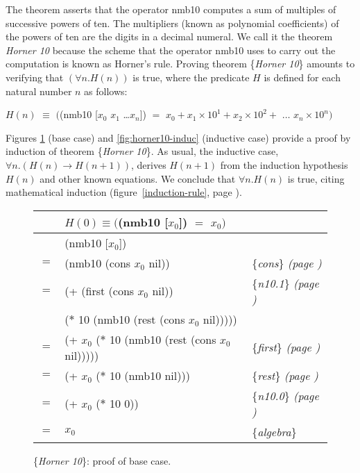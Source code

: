 The theorem asserts that the operator \textsf{nmb10}
computes a sum of multiples of successive powers of ten.
The multipliers
(known as polynomial coefficients)
of the powers of ten are the digits in a decimal numeral.
We call it the theorem \emph{Horner 10} because
the scheme that the operator \textsf{nmb10} uses to carry out the computation is
known as Horner's rule.
Proving theorem \{\emph{Horner 10}\} amounts to
verifying that $(\forall n.H(n))$ is true,
where the predicate $H$ is defined for each natural number $n$
as follows:
\begin{center}
$H(n)$ $\equiv$ $($\textsf{(nmb10 [$x_0$ $x_1$ \dots $x_{n}$])} $=$
$x_0 + x_1 \times 10^1 + x_2 \times 10^2 +$ $\dots$ $x_{n} \times 10^{n})$
\end{center}

Figures \ref{fig:horner10-base} (base case) and \ref{fig:horner10-induc}
(inductive case) provide a proof by induction of theorem \{\emph{Horner 10}\}.
As usual, the inductive case, $\forall n. (H(n) \rightarrow H(n+1))$,
derives $H(n+1)$ from the induction hypothesis $H(n)$ and other known
equations.
We conclude that $\forall n.H(n)$ is true,
citing mathematical induction
(figure~\ref{induction-rule}, page \pageref{induction-rule}).

\begin{figure}
\begin{center}
\begin{tabular}{rll}
&$H(0) \equiv ($\textsf{(nmb10 [$x_0$])} $=$ $x_0)$&\\
\hline
    & \textsf{(nmb10 [$x_0$])}           & \\
$=$ & \textsf{(nmb10 (cons $x_0$ nil))}  & \{\emph{cons}\} \emph{(page \pageref{first-rest-cons})} \\
$=$ & \textsf{(+ (first (cons $x_0$ nil))}  & \{\emph{n10.1}\} \emph{(page \pageref{nmb10-defun})} \\
    & \phantom{\textsf{(+ }}\textsf{($*$ 10 (nmb10 (rest (cons $x_0$ nil)))))} &\\
$=$ & \textsf{(+ $x_0$ ($*$ 10 (nmb10 (rest (cons $x_0$ nil)))))}  & \{\emph{first}\} \emph{(page \pageref{first-rest-cons})} \\
$=$ & \textsf{(+ $x_0$ ($*$ 10 (nmb10 nil)))}  & \{\emph{rest}\} \emph{(page \pageref{first-rest-cons})} \\
$=$ & \textsf{(+ $x_0$ ($*$ 10 0))}  & \{\emph{n10.0}\} \emph{(page \pageref{nmb10-defun})} \\
$=$ & $x_0$  & \{\emph{algebra}\} \\
\end{tabular}
\end{center}
\caption{\{\emph{Horner 10}\}: proof of base case.}
\label{fig:horner10-base}
\end{figure}

